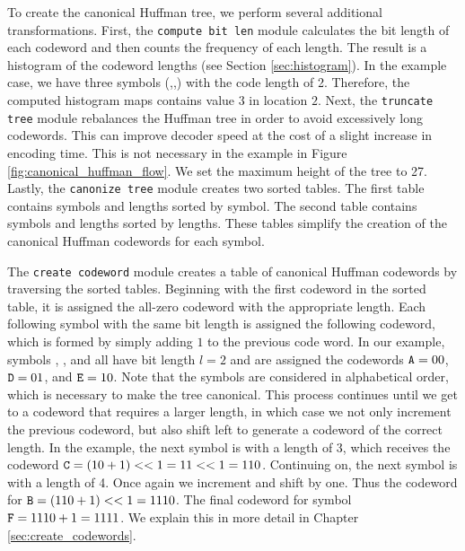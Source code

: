 To create the canonical Huffman tree, we perform several additional transformations.   First, the \lstinline{compute bit len} module calculates the bit length of each codeword and then counts the frequency of each length. The result is a histogram of the codeword lengths (see Section \ref{sec:histogram}).  In the example case, we have three symbols (,,) with the code length of 2. Therefore, the computed histogram maps contains value $3$ in location $2$. Next, the \lstinline{truncate tree} module rebalances the Huffman tree in order to avoid excessively long codewords. This can improve decoder speed at the cost of a slight increase in encoding time. This is not necessary in the example in Figure \ref{fig:canonical_huffman_flow}. We set the maximum height of the tree to 27.  Lastly, the \lstinline{canonize tree} module creates two sorted tables. The first table contains symbols and lengths sorted by symbol. The second table contains symbols and lengths sorted by lengths. These tables simplify the creation of the canonical Huffman codewords for each symbol.

The \lstinline{create codeword} module creates a table of canonical Huffman codewords by traversing the sorted tables. Beginning with the first codeword in the sorted table, it is assigned the all-zero codeword with the appropriate length.  Each following symbol with the same bit length is assigned the following codeword, which is formed by simply adding $1$ to the previous code word.  In our example, symbols , , and  all have bit length $l = 2$ and are assigned the codewords $\texttt{A} = 00$, $\texttt{D} = 01$, and $\texttt{E} = 10$.  Note that the symbols are considered in alphabetical order, which is necessary to make the tree canonical.  This process continues until we get to a codeword that requires a larger length, in which case we not only increment the previous codeword, but also shift left to generate a codeword of the correct length.  In the example, the next symbol is  with a length of 3, which receives the codeword $\texttt{C} = (10 + 1) << 1 = 11 << 1 = 110$. Continuing on, the next symbol is  with a length of 4.  Once again we increment and shift by one. Thus the codeword for $\texttt{B} = (110 + 1) << 1 = 1110$. The final codeword for symbol $\texttt{F} = 1110 + 1 = 1111$. We explain this in more detail in Chapter \ref{sec:create_codewords}.  


